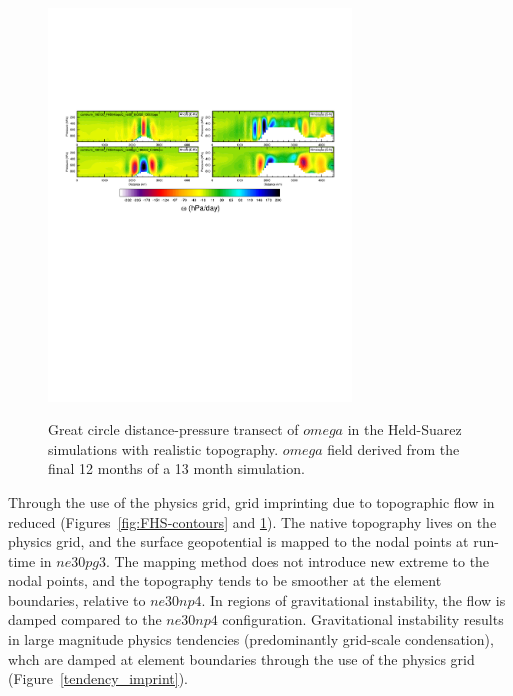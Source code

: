 \documentclass[twocol]{ametsoc}
\begin{document}
\begin{figure}[t]
\noindent\includegraphics[width=19pc,angle=0]{figs/FHS_transect.pdf}\\
\caption{Great circle distance-pressure transect of $omega$ in the Held-Suarez simulations with realistic topography. $omega$ field derived from the final 12 months of a 13 month simulation.}
\label{fig:FHS-transect}
\end{figure}

Through the use of the physics grid, grid imprinting due to topographic flow in reduced (Figures~\ref{fig:FHS-contours} and \ref{fig:FHS-transect}). The native topography lives on the physics grid, and the surface geopotential is mapped to the nodal points at run-time in $ne30pg3$. The mapping method does not introduce new extreme to the nodal points, and the topography tends to be smoother at the element boundaries, relative to $ne30np4$. In regions of gravitational instability, the flow is damped compared to the $ne30np4$ configuration. Gravitational instability results in large magnitude physics tendencies (predominantly grid-scale condensation), whch are damped at element boundaries through the use of the physics grid (Figure~\ref{tendency_imprint}). 
\end{document}
